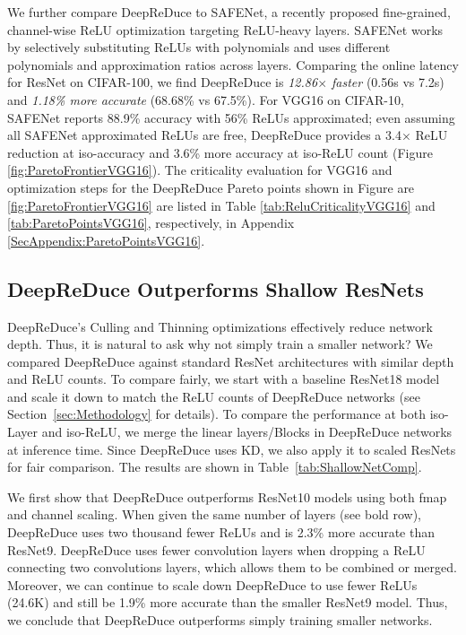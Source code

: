 We further compare DeepReDuce to SAFENet, a recently proposed \cite{lou2021safenet} fine-grained, channel-wise ReLU optimization targeting ReLU-heavy layers. 
SAFENet works by selectively substituting ReLUs with polynomials and uses different polynomials and approximation ratios across layers.
Comparing the online latency for ResNet on CIFAR-100, we find DeepReDuce is {\em 12.86$\times$ faster} (0.56s vs 7.2s) and {\em 1.18\% more accurate} (68.68\% vs 67.5\%). For VGG16 on CIFAR-10, SAFENet reports 88.9\% accuracy with 56\% ReLUs approximated; even assuming all SAFENet approximated ReLUs are free, DeepReDuce provides a 3.4$\times$ ReLU reduction at iso-accuracy and 3.6\% more accuracy at iso-ReLU count (Figure \ref{fig:ParetoFrontierVGG16}). The criticality evaluation for VGG16 and optimization steps for the DeepReDuce Pareto points shown in Figure are \ref{fig:ParetoFrontierVGG16} are listed in Table \ref{tab:ReluCriticalityVGG16} and \ref{tab:ParetoPointsVGG16}, respectively, in Appendix \ref{SecAppendix:ParetoPointsVGG16}.






\subsection{DeepReDuce Outperforms Shallow ResNets} \label{subsec:ShallowResNet}

DeepReDuce's Culling and Thinning optimizations effectively reduce network depth. 
Thus, it is natural to ask why not simply train a smaller network?
We compared DeepReDuce against 
standard ResNet architectures with similar depth and ReLU counts. 
To compare fairly, we start with a baseline ResNet18 model and scale it down
to match the ReLU counts of DeepReDuce networks (see Section~\ref{sec:Methodology} for details).
To compare the performance at both iso-Layer and iso-ReLU, 
we merge the linear layers/Blocks in DeepReDuce networks at inference time. 
Since DeepReDuce uses KD, we also apply it to scaled ResNets for fair comparison. 
The results are shown in Table~\ref{tab:ShallowNetComp}. 

We first show that DeepReDuce outperforms ResNet10 models using both fmap and channel scaling.
When given the same number of layers (see bold row), DeepReDuce
uses two thousand fewer ReLUs and is 2.3\% more accurate than ResNet9.
DeepReDuce uses fewer convolution layers when dropping a ReLU connecting two
convolutions layers, which allows them to be combined or merged.
Moreover, we can continue to scale down DeepReDuce to use fewer ReLUs (24.6K)
and still be 1.9\% more accurate than the smaller ResNet9 model.
Thus, we conclude that DeepReDuce outperforms simply training smaller networks.




